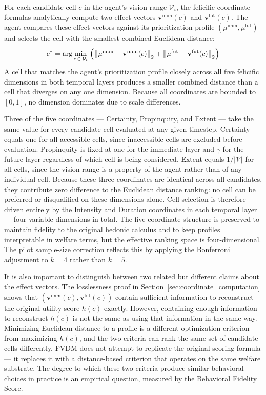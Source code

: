 \documentclass{icsthesis}
\begin{document}
\begin{mainmatter}
For each candidate cell $c$ in the agent's vision range $\mathcal{V}_i$, the felicific coordinate formulas analytically compute two effect vectors $\mathbf{v}^{\mathrm{imm}}(c)$ and $\mathbf{v}^{\mathrm{fut}}(c)$. The agent compares these effect vectors against its prioritization profile $(\mu^{\mathrm{imm}}, \mu^{\mathrm{fut}})$ and selects the cell with the smallest combined Euclidean distance:
\[
c^* = \arg\min_{c \,\in\, \mathcal{V}_i}\;\Bigl(\bigl\lVert \mu^{\mathrm{imm}} - \mathbf{v}^{\mathrm{imm}}(c)\bigr\rVert_2 + \bigl\lVert \mu^{\mathrm{fut}} - \mathbf{v}^{\mathrm{fut}}(c)\bigr\rVert_2\Bigr)
\]
A cell that matches the agent's prioritization profile closely across all five felicific dimensions in both temporal layers produces a smaller combined distance than a cell that diverges on any one dimension. Because all coordinates are bounded to $[0,1]$, no dimension dominates due to scale differences.

Three of the five coordinates --- Certainty, Propinquity, and Extent --- take the same value for every candidate cell evaluated at any given timestep. Certainty equals one for all accessible cells, since inaccessible cells are excluded before evaluation. Propinquity is fixed at one for the immediate layer and $\gamma$ for the future layer regardless of which cell is being considered. Extent equals $1/|\mathcal{V}|$ for all cells, since the vision range is a property of the agent rather than of any individual cell. Because these three coordinates are identical across all candidates, they contribute zero difference to the Euclidean distance ranking: no cell can be preferred or disqualified on these dimensions alone. Cell selection is therefore driven entirely by the Intensity and Duration coordinates in each temporal layer --- four variable dimensions in total. The five-coordinate structure is preserved to maintain fidelity to the original hedonic calculus and to keep profiles interpretable in welfare terms, but the effective ranking space is four-dimensional. The pilot sample-size correction reflects this by applying the Bonferroni adjustment to $k = 4$ rather than $k = 5$.

It is also important to distinguish between two related but different claims about the effect vectors. The losslessness proof in Section~\ref{sec:coordinate_computation} shows that $(\mathbf{v}^{\mathrm{imm}}(c), \mathbf{v}^{\mathrm{fut}}(c))$ contain sufficient information to reconstruct the original utility score $h(c)$ exactly. However, containing enough information to reconstruct $h(c)$ is not the same as using that information in the same way. Minimizing Euclidean distance to a profile is a different optimization criterion from maximizing $h(c)$, and the two criteria can rank the same set of candidate cells differently. FVDM does not attempt to replicate the original scoring formula --- it replaces it with a distance-based criterion that operates on the same welfare substrate. The degree to which these two criteria produce similar behavioral choices in practice is an empirical question, measured by the Behavioral Fidelity Score.


\end{mainmatter}
\end{document}
